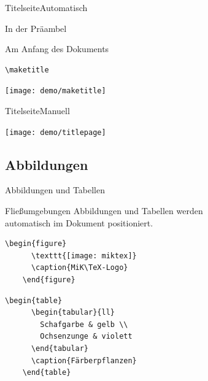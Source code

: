 \begin{Frame}[t,fragile]{Titelseite}{Automatisch}
  \begin{Block}{In der Präambel}
    
  \end{Block}

  \begin{Block}{Am Anfang des Dokuments}
    \begin{lstlisting}[gobble=6,style=block]
      \maketitle
    \end{lstlisting}
  \end{Block}

  \centerline{\texttt{[image: demo/maketitle]}}
\end{Frame}

\begin{Frame}[fragile]{Titelseite}{Manuell}
  

  \centerline{\texttt{[image: demo/titlepage]}}
\end{Frame}

\subsection{Abbildungen}

\begin{Frame}[fragile]{Abbildungen und Tabellen}
  \begin{Block}{Fließumgebungen}
    Abbildungen und Tabellen werden\\
    automatisch im Dokument positioniert.
  \end{Block}

  \begin{lstlisting}[gobble=4]
    \begin{figure}
      \texttt{[image: miktex]}
      \caption{MiK\TeX-Logo}
    \end{figure}
  \end{lstlisting}

  \begin{lstlisting}[gobble=4]
    \begin{table}
      \begin{tabular}{ll}
        Schafgarbe & gelb \\
        Ochsenzunge & violett
      \end{tabular}
      \caption{Färberpflanzen}
    \end{table}
  \end{lstlisting}
\end{Frame}

